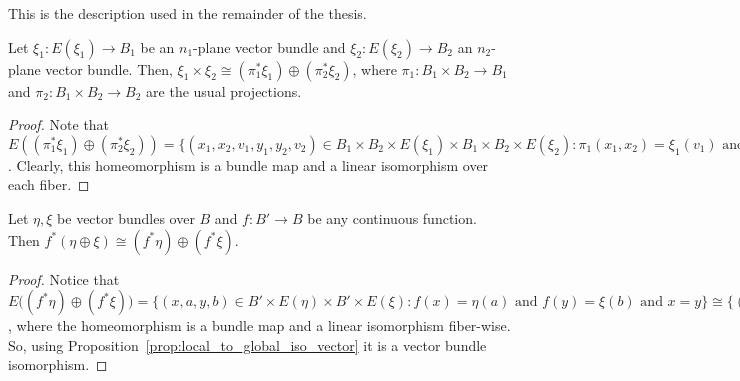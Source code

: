 This is the description used in the remainder of the thesis.
\begin{proposition}\label{prop:product_bundle_to_whitney_sum} Let $\xi_1:E(\xi_1)\to B_1$ be an $n_1$-plane vector bundle and $\xi_2:E(\xi_2)\to B_2$ an $n_2$-plane vector bundle. Then, $\xi_1\times\xi_2\cong (\pi_1^*\xi_1)\oplus(\pi_2^*\xi_2)$, where $\pi_1:B_1\times B_2\to B_1$ and $\pi_2:B_1\times B_2\to B_2$ are the usual projections.
\end{proposition}
\begin{proof} Note that $E((\pi_1^*\xi_1)\oplus(\pi_2^*\xi_2))=\big\{(x_1,x_2,v_1,y_1,y_2,v_2)\in B_1\times B_2\times E(\xi_1)\times B_1\times B_2\times E(\xi_2):\pi_1(x_1,x_2)=\xi_1(v_1)\text{ and }\pi_2(y_1,y_2)=\xi_2(v_2)\text{ and }(x_1,x_2)=(y_1,y_2)\big\}\cong\big\{(x_1,x_2,v_1,v_2)\in B_1\times B_2\times E(\xi_1)\times E(\xi_2):x_1=\xi_1(v_1)\text{ and }x_2=\xi_2(v_2)\}=E(\xi_1\times\xi_2)$.
Clearly, this homeomorphism is a bundle map and a linear isomorphism over each fiber.
\end{proof}

\begin{lemma}\label{lem:induced_sum} Let $\eta,\xi$ be vector bundles over $B$ and $f:B'\to B$ be any continuous function. Then $f^*(\eta\oplus\xi)\cong(f^*\eta)\oplus(f^*\xi)$.
\end{lemma}
\begin{proof} Notice that $E\big((f^*\eta)\oplus(f^*\xi)\big)=\big\{(x,a,y,b)\in B'\times E(\eta)\times B'\times E(\xi):f(x)=\eta(a)\text{ and }f(y)=\xi(b)\text{ and }x=y\big\}\cong\big\{(x,a,b)\in B'\times E(\eta)\times E(\xi):\eta(a)=\xi(b)=x\big\}=E\big(f^*(\eta\oplus\xi)\big)$, where the homeomorphism is a bundle map and a linear isomorphism fiber-wise. So, using Proposition~\ref{prop:local_to_global_iso_vector} it is a vector bundle isomorphism.
\end{proof}

